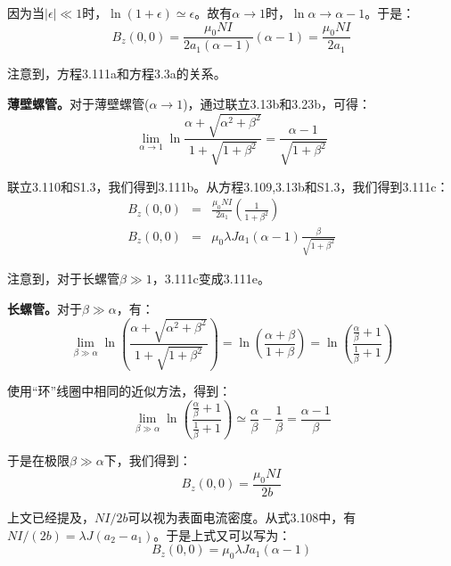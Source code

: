 因为当$|\epsilon|\ll 1$时，$\ln (1+\epsilon)\simeq \epsilon$。故有$\alpha\rightarrow 1$时，$\ln \alpha\rightarrow \alpha-1$。于是：
\begin{equation*}
B_z(0,0)=\frac{\mu_0NI}{2a_1(\alpha-1)}(\alpha-1)=\frac{\mu_0NI}{2a_1}\tag{3.111}%
\end{equation*}

注意到，方程3.111a和方程3.3a的关系。

\textbf{薄壁螺管。}对于薄壁螺管($\alpha\rightarrow 1$)，通过联立3.13b和3.23b，可得：
\begin{equation*}
\lim_{\alpha\rightarrow 1}\ln\frac{\alpha+\sqrt{\alpha^2+\beta^2}}{1+\sqrt{1+\beta^2}}=\frac{\alpha-1}{\sqrt{1+\beta^2}} \tag{S1.3}%
\end{equation*}

联立3.110和S1.3，我们得到3.111b。从方程3.109,3.13b和S1.3，我们得到3.111c：
\begin{align*}
B_z(0,0)&=&\frac{\mu_0 NI}{2a_1}(\frac{1}{1+\beta^2})\tag{3.111b}\\ %
B_z(0,0)&=&\mu_0 \lambda Ja_1(\alpha-1)\frac{\beta}{\sqrt{1+\beta^2}}\tag{3.111c}%
\end{align*}

注意到，对于长螺管$\beta\gg 1$，3.111c变成3.111e。

\textbf{长螺管。}对于$\beta\gg \alpha$，有：
\begin{equation*}
\lim_{\beta\gg\alpha}\ln\left(\frac{\alpha+\sqrt{\alpha^2+\beta^2}}{1+\sqrt{1+\beta^2}}\right)=\ln\left(\frac{\alpha+\beta}{1+\beta}\right)=\ln\left(\frac{\frac{\alpha}{\beta}+1}{\frac{1}{\beta}+1}\right)%
\end{equation*}

使用“环”线圈中相同的近似方法，得到：
\begin{equation*}
\lim_{\beta\gg\alpha}\ln\left(\frac{\frac{\alpha}{\beta}+1}{\frac{1}{\beta}+1}\right)\simeq\frac{\alpha}{\beta}-\frac{1}{\beta}=\frac{\alpha-1}{\beta}%
\end{equation*}

于是在极限$\beta\gg\alpha$下，我们得到：
\begin{equation*}
B_z(0,0)=\frac{\mu_0NI}{2b} \tag{3.111d}%
\end{equation*}

上文已经提及，$NI/2b$可以视为表面电流密度。从式3.108中，有$NI/(2b)=\lambda J (a_2-a_1)$。于是上式又可以写为：
\begin{equation*}
B_z(0,0)=\mu_0\lambda Ja_1(\alpha-1) \tag{3.111e}%
\end{equation*}

